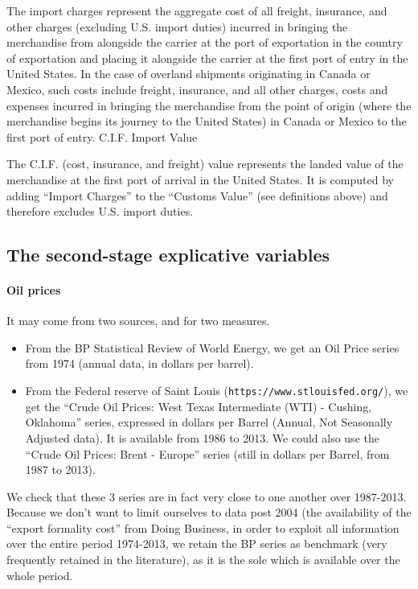 \documentclass[a4paper,11pt]{article}
\begin{document}
The import charges represent the aggregate cost of all freight, insurance, and other charges (excluding U.S. import duties) incurred in bringing the merchandise from alongside the carrier at the port of exportation in the country of exportation and placing it alongside the carrier at the first port of entry in the United States. In the case of overland shipments originating in Canada or Mexico, such costs include freight, insurance, and all other charges, costs and expenses incurred in bringing the merchandise from the point of origin (where the merchandise begins its journey to the United States) in Canada or Mexico to the first port of entry.
C.I.F. Import Value

The C.I.F. (cost, insurance, and freight) value represents the landed value of the merchandise at the first port of arrival in the United States. It is computed by adding ``Import Charges'' to the ``Customs Value'' (see definitions above) and therefore excludes U.S. import duties.

\subsection{The second-stage explicative variables}

\paragraph{Oil prices} It may come from two sources, and for two measures. 
\begin{itemize}
\item From the BP Statistical Review of World Energy, we get an Oil Price series from 1974 (annual data, in dollars per barrel). 
\item From the Federal reserve of Saint Louis (\texttt{https://www.stlouisfed.org/}), we get the ``Crude Oil Prices: West Texas Intermediate (WTI) - Cushing, Oklahoma'' series, expressed in dollars per Barrel (Annual, Not Seasonally Adjusted data). It is available from 1986 to 2013. We could also use the ``Crude Oil Prices: Brent - Europe'' series (still in dollars per Barrel, from 1987 to 2013).  
  
\end{itemize}

We check that these 3 series are in fact very close to one another over 1987-2013. Because we don't want to limit ourselves to data post 2004 (the availability of the ``export formality cost'' from Doing Business, in order to exploit all information over the entire period 1974-2013, we retain the BP series as benchmark (very frequently retained in the literature), as it is the sole which is available over the whole period.
\end{document}

